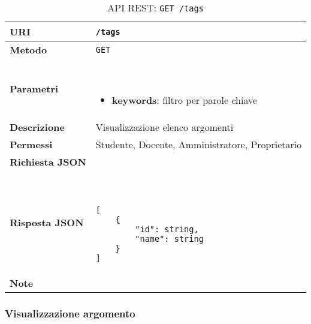         \begin{table}[H]
            \begin{center}
                \begin{tabular}{p{} p{}}
                    \toprule
                    \textbf{URI} & \texttt{/tags} \\ \midrule
                    \textbf{Metodo} & \texttt{GET} \\ \midrule
                    \textbf{Parametri} & \
                        \begin{itemize}
                            \item \textbf{keywords}: filtro per parole chiave
                        \end{itemize}
                        \\ \midrule
                    \textbf{Descrizione} & Visualizzazione elenco argomenti \\ \midrule
                    \textbf{Permessi} & Studente, Docente, Amministratore, Proprietario  \\ \midrule
                    \textbf{Richiesta JSON} & \\ \midrule
                    \textbf{Risposta JSON} & \
                        \begin{lstlisting}[basicstyle={\ttfamily}]
[
    {
        "id": string,
        "name": string
    }
]
                        \end{lstlisting}
                        \\ \midrule
                    \textbf{Note} & \\
                    \bottomrule
                \end{tabular}
                \caption{API REST: \texttt{GET /tags}}
            \end{center}
        \end{table}

    \subsubsection{Visualizzazione argomento}

